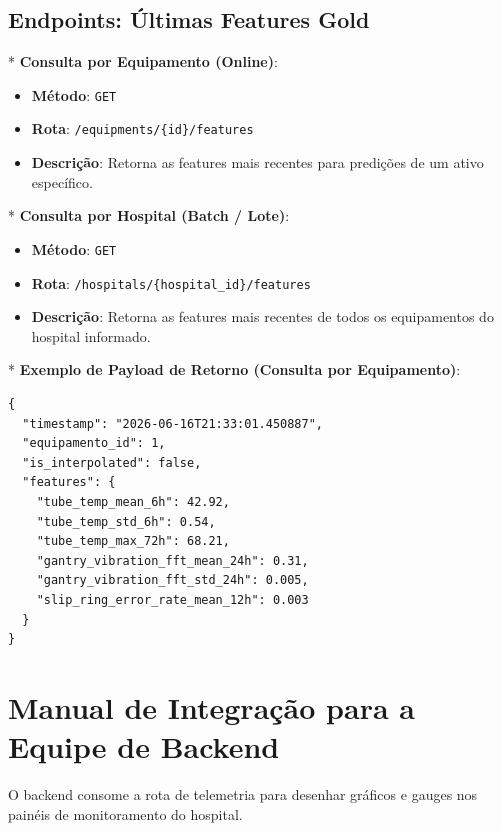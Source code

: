 \documentclass[12pt,a4paper]{article}
\begin{document}
\subsection{Endpoints: Últimas Features Gold}
*   \textbf{Consulta por Equipamento (Online)}:
    \begin{itemize}
        \item \textbf{Método}: \texttt{GET}
        \item \textbf{Rota}: \texttt{/equipments/\{id\}/features}
        \item \textbf{Descrição}: Retorna as features mais recentes para predições de um ativo específico.
    \end{itemize}
*   \textbf{Consulta por Hospital (Batch / Lote)}:
    \begin{itemize}
        \item \textbf{Método}: \texttt{GET}
        \item \textbf{Rota}: \texttt{/hospitals/\{hospital\_id\}/features}
        \item \textbf{Descrição}: Retorna as features mais recentes de todos os equipamentos do hospital informado.
    \end{itemize}
*   \textbf{Exemplo de Payload de Retorno (Consulta por Equipamento)}:
\begin{lstlisting}
{
  "timestamp": "2026-06-16T21:33:01.450887",
  "equipamento_id": 1,
  "is_interpolated": false,
  "features": {
    "tube_temp_mean_6h": 42.92,
    "tube_temp_std_6h": 0.54,
    "tube_temp_max_72h": 68.21,
    "gantry_vibration_fft_mean_24h": 0.31,
    "gantry_vibration_fft_std_24h": 0.005,
    "slip_ring_error_rate_mean_12h": 0.003
  }
}
\end{lstlisting}

\newpage

\section{Manual de Integração para a Equipe de Backend}

O backend consome a rota de telemetria para desenhar gráficos e gauges nos painéis de monitoramento do hospital.
\end{document}

